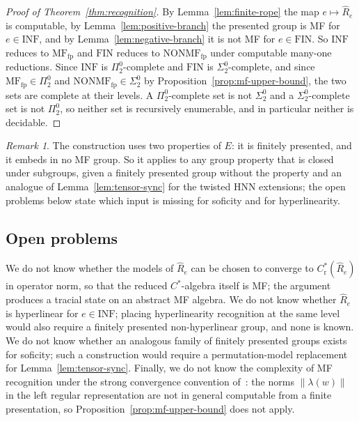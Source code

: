 \documentclass[11pt]{amsart}
\theoremstyle{remark}
\newtheorem{remark}[theorem]{Remark}
\theoremstyle{plain}
\newcommand{\opnorm}[1]{\left\lVert #1\right\rVert}
\begin{document}
\begin{proof}[Proof of Theorem~\ref{thm:recognition}]
By Lemma~\ref{lem:finite-rope} the map $e\mapsto\widehat R_e$ is
computable, by Lemma~\ref{lem:positive-branch} the presented group is MF
for $e\in\mathrm{INF}$, and by Lemma~\ref{lem:negative-branch} it is not MF
for $e\in\mathrm{FIN}$.  So $\mathrm{INF}$ reduces to
$\mathrm{MF}_{\mathrm{fp}}$ and $\mathrm{FIN}$ reduces to
$\mathrm{NONMF}_{\mathrm{fp}}$ under computable many-one reductions.  Since
$\mathrm{INF}$ is $\Pi^0_2$-complete and $\mathrm{FIN}$ is
$\Sigma^0_2$-complete, and since
$\mathrm{MF}_{\mathrm{fp}}\in\Pi^0_2$ and
$\mathrm{NONMF}_{\mathrm{fp}}\in\Sigma^0_2$ by
Proposition~\ref{prop:mf-upper-bound}, the two sets are complete at their
levels.  A $\Pi^0_2$-complete set is not $\Sigma^0_2$ and a
$\Sigma^0_2$-complete set is not $\Pi^0_2$, so neither set is recursively
enumerable, and in particular neither is decidable.
\end{proof}

\begin{remark}\label{rem:template}
The construction uses two properties of $E$: it is finitely presented, and
it embeds in no MF group.  So it applies to any group property that is
closed under subgroups, given a finitely presented group without the
property and an analogue of Lemma~\ref{lem:tensor-sync} for the twisted
HNN extensions; the open problems below state which input is missing for
soficity and for hyperlinearity.
\end{remark}

\subsection*{Open problems}

We do not know whether the models of $\widehat R_e$ can be chosen to
converge to $C^*_{\mathrm r}(\widehat R_e)$ in operator norm, so that the
reduced $C^*$-algebra itself is MF; the argument produces a tracial state
on an abstract MF algebra.  We do not know whether $\widehat R_e$ is
hyperlinear for $e\in\mathrm{INF}$; placing hyperlinearity recognition at
the same level would also require a finitely presented non-hyperlinear
group, and none is known.  We do not know whether an analogous family of
finitely presented groups exists for soficity; such a construction would
require a permutation-model replacement for Lemma~\ref{lem:tensor-sync}.
Finally, we do not know the complexity of MF recognition under the strong
convergence convention of~\cite{GaoEtAl,Schafhauser}: the norms
$\opnorm{\lambda(w)}$ in the left regular representation are not in
general computable from a finite presentation, so
Proposition~\ref{prop:mf-upper-bound} does not apply.
\end{document}
